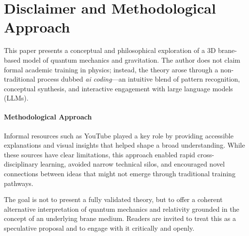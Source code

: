 \section{Disclaimer and Methodological
Approach}\label{disclaimer-and-methodological-approach}

This paper presents a conceptual and philosophical exploration of a 3D
brane-based model of quantum mechanics and gravitation. The author does
not claim formal academic training in physics; instead, the theory arose
through a non-traditional process dubbed \emph{ai coding}---an
intuitive blend of pattern recognition, conceptual synthesis, and
interactive engagement with large language models (LLMs).

\paragraph{Methodological Approach}

Informal resources such as YouTube played a key role by providing
accessible explanations and visual insights that helped shape a broad
understanding. While these sources have clear limitations, this approach
enabled rapid cross-disciplinary learning, avoided narrow technical
silos, and encouraged novel connections between ideas that might not emerge through traditional training pathways.

The goal is not to present a fully validated theory, but to offer a
coherent alternative interpretation of quantum mechanics and relativity
grounded in the concept of an underlying brane medium. Readers are invited to
treat this as a speculative proposal and to engage with it critically
and openly.